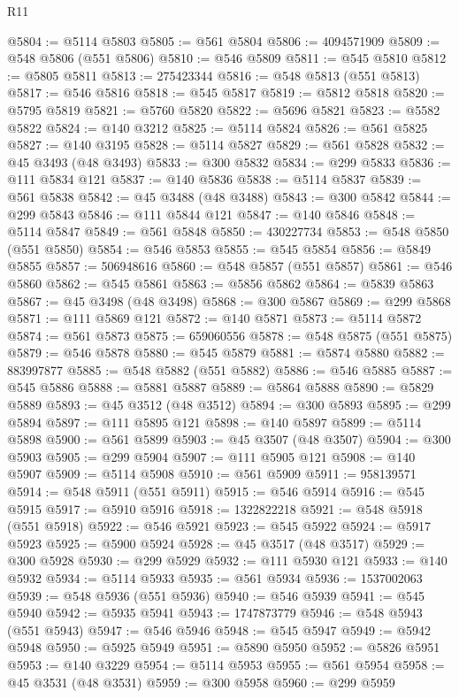 \begin{lexlean}{R11}
\begin{coremodule}
{{{{{{{{{{{{{{{{{{{{{{{{{{{{{{{{{{{{{{{{{{{{{{{{{{{{{{{{{{{{{{{{{{{{{{{{{{{{{{{{{{@5804 := @5114 @5803
@5805 := @561 @5804
@5806 := 4094571909
@5809 := @548 @5806 (@551 @5806)
@5810 := @546 @5809
@5811 := @545 @5810
@5812 := @5805 @5811
@5813 := 275423344
@5816 := @548 @5813 (@551 @5813)
@5817 := @546 @5816
@5818 := @545 @5817
@5819 := @5812 @5818
@5820 := @5795 @5819
@5821 := @5760 @5820
@5822 := @5696 @5821
@5823 := @5582 @5822
@5824 := @140 @3212
@5825 := @5114 @5824
@5826 := @561 @5825
@5827 := @140 @3195
@5828 := @5114 @5827
@5829 := @561 @5828
@5832 := @45 @3493 (@48 @3493)
@5833 := @300 @5832
@5834 := @299 @5833
@5836 := @111 @5834 @121
@5837 := @140 @5836
@5838 := @5114 @5837
@5839 := @561 @5838
@5842 := @45 @3488 (@48 @3488)
@5843 := @300 @5842
@5844 := @299 @5843
@5846 := @111 @5844 @121
@5847 := @140 @5846
@5848 := @5114 @5847
@5849 := @561 @5848
@5850 := 430227734
@5853 := @548 @5850 (@551 @5850)
@5854 := @546 @5853
@5855 := @545 @5854
@5856 := @5849 @5855
@5857 := 506948616
@5860 := @548 @5857 (@551 @5857)
@5861 := @546 @5860
@5862 := @545 @5861
@5863 := @5856 @5862
@5864 := @5839 @5863
@5867 := @45 @3498 (@48 @3498)
@5868 := @300 @5867
@5869 := @299 @5868
@5871 := @111 @5869 @121
@5872 := @140 @5871
@5873 := @5114 @5872
@5874 := @561 @5873
@5875 := 659060556
@5878 := @548 @5875 (@551 @5875)
@5879 := @546 @5878
@5880 := @545 @5879
@5881 := @5874 @5880
@5882 := 883997877
@5885 := @548 @5882 (@551 @5882)
@5886 := @546 @5885
@5887 := @545 @5886
@5888 := @5881 @5887
@5889 := @5864 @5888
@5890 := @5829 @5889
@5893 := @45 @3512 (@48 @3512)
@5894 := @300 @5893
@5895 := @299 @5894
@5897 := @111 @5895 @121
@5898 := @140 @5897
@5899 := @5114 @5898
@5900 := @561 @5899
@5903 := @45 @3507 (@48 @3507)
@5904 := @300 @5903
@5905 := @299 @5904
@5907 := @111 @5905 @121
@5908 := @140 @5907
@5909 := @5114 @5908
@5910 := @561 @5909
@5911 := 958139571
@5914 := @548 @5911 (@551 @5911)
@5915 := @546 @5914
@5916 := @545 @5915
@5917 := @5910 @5916
@5918 := 1322822218
@5921 := @548 @5918 (@551 @5918)
@5922 := @546 @5921
@5923 := @545 @5922
@5924 := @5917 @5923
@5925 := @5900 @5924
@5928 := @45 @3517 (@48 @3517)
@5929 := @300 @5928
@5930 := @299 @5929
@5932 := @111 @5930 @121
@5933 := @140 @5932
@5934 := @5114 @5933
@5935 := @561 @5934
@5936 := 1537002063
@5939 := @548 @5936 (@551 @5936)
@5940 := @546 @5939
@5941 := @545 @5940
@5942 := @5935 @5941
@5943 := 1747873779
@5946 := @548 @5943 (@551 @5943)
@5947 := @546 @5946
@5948 := @545 @5947
@5949 := @5942 @5948
@5950 := @5925 @5949
@5951 := @5890 @5950
@5952 := @5826 @5951
@5953 := @140 @3229
@5954 := @5114 @5953
@5955 := @561 @5954
@5958 := @45 @3531 (@48 @3531)
@5959 := @300 @5958
@5960 := @299 @5959
}}}}}}}}}}}}}}}}}}}}}}}}}}}}}}}}}}}}}}}}}}}}}}}}}}}}}}}}}}}}}}}}}}}}}}}}}}}}}}}}}}
\end{coremodule}
\end{lexlean}
